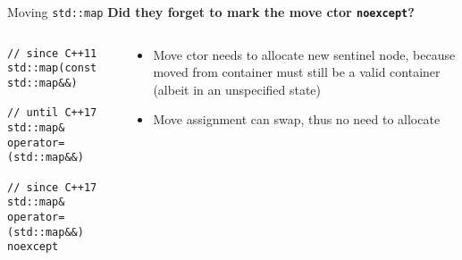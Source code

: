 \begin{frame}[fragile]{Moving \texttt{std::map}}
    \textbf{Did they forget to mark the move ctor \texttt{noexcept}?} 

    \begin{columns}[t]
        \begin{column}{.49\textwidth}
            \begin{lstlisting}[numbers=none]
// since C++11
std::map(const std::map&&)

// until C++17
std::map& operator=(std::map&&)

// since C++17
std::map& operator=(std::map&&) noexcept
            \end{lstlisting}
        \end{column}
        \begin{column}{.5\textwidth}
            \begin{itemize}
                \item<2> Move ctor needs to allocate new sentinel node, because moved from container must still be a valid container (albeit in an unspecified state)
                \item<2> Move assignment can swap, thus no need to allocate
            \end{itemize}
        \end{column}
    \end{columns}

\end{frame}

